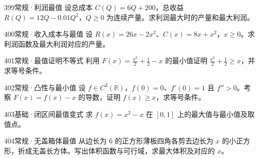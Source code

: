 \begin{exercise}{399}{常规·利润最值}
设总成本 $C(Q)=6Q+200$，总收益 $R(Q)=12Q-0.01Q^2$，$Q\ge0$ 为连续产量。求利润最大时的产量和最大利润。
\end{exercise}
\begin{exercise}{400}{常规·收入成本与最值}
设 $R(x)=26x-2x^2$、$C(x)=8x+x^2$，$x\ge0$。求利润函数及最大利润对应的产量。
\end{exercise}
\begin{exercise}{401}{常规·最值证明不等式}
利用 $F(x)=\frac{x^2}{2}+\frac{1}{2}-x$ 的最小值证明 $\frac{x^2}{2}+\frac{1}{2}\ge x$，并求等号条件。
\end{exercise}
\begin{exercise}{402}{常规·凸性与最小值}
设 $f\in C^2(\mathbb R)$，$f(0)=0$、$f'(0)=1$ 且 $f''>0$。考察 $F(x)=f(x)-x$ 的导数，证明 $f(x)\ge x$，求等号条件。
\end{exercise}
\begin{exercise}{403}{基础·闭区间最值变式}
求 $f(x)=x^2-x$ 在 $[0,1]$ 上的最大值与最小值及取值点。
\end{exercise}
\begin{exercise}{404}{常规·无盖箱体最值}
从边长为 $6$ 的正方形薄板四角各剪去边长为 $x$ 的小正方形，折成无盖长方体。写出体积函数与可行域，求最大体积及对应的 $x$。
\end{exercise}
